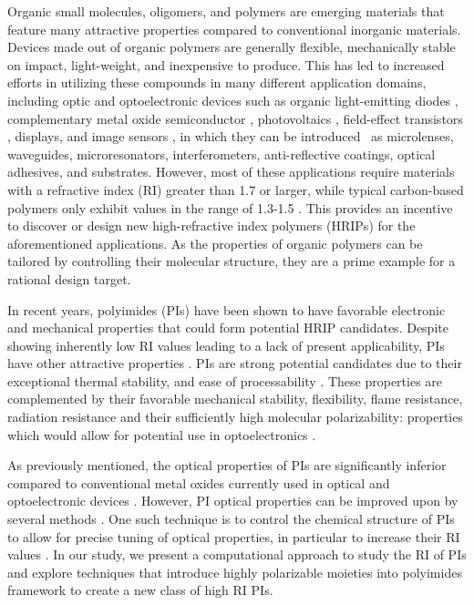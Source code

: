 Organic small molecules, oligomers, and polymers are emerging materials that feature many attractive properties compared to conventional inorganic materials. Devices made out of organic polymers are generally flexible, mechanically stable on impact, light-weight, and inexpensive to produce. This has led to increased efforts in utilizing these compounds in many different application domains, including optic and optoelectronic devices such as organic light-emitting diodes \cite{ThejoKalyani2012}, complementary metal oxide semiconductor \cite{Nakagawa2010},  photovoltaics \cite{Hachmann2011}, field-effect transistors \cite{Sirringhaus2009}, displays, and image sensors \cite{Angione2011}, in which they can be introduced \insitu\ as microlenses, waveguides, microresonators, interferometers, anti-reflective coatings, optical adhesives, and substrates. However, most of these applications require materials with a refractive index (RI) greater than 1.7 or larger, while typical carbon-based polymers only exhibit values in the range of 1.3-1.5 \cite{Liu2009}. This provides an incentive to discover or design new high-refractive index polymers (HRIPs) for the aforementioned applications. As the properties of organic polymers can be tailored by controlling their molecular structure, they are a prime example for a rational design target.

In recent years, polyimides (PIs) have been shown to have favorable electronic and mechanical properties that could form potential HRIP candidates. Despite showing inherently low RI values leading to a lack of present applicability, PIs have other attractive properties \citep{Mathews2007,Chang2006}.  
PIs are strong potential candidates due to their exceptional thermal stability, and ease of processability \citep{Duesselberg2011,Liu2007a,Higashihara2015}. These properties are complemented by their favorable mechanical stability, flexibility, flame resistance, radiation resistance and their sufficiently high molecular polarizability: properties which would allow for potential use in optoelectronics \citep{Mittal2013,Barikani2000}.

As previously mentioned, the optical properties of PIs are significantly inferior compared to conventional metal oxides currently used in optical and optoelectronic devices \citep{Butnaru2013,Liu2009}. However, PI optical properties can be improved upon by several methods \citep{Fukuzaki2010,Liu2008b,Sydlik2011,Terraza2008,Carter2001}. One such technique is to control the chemical structure of PIs to allow for precise tuning of optical properties, in particular to increase their RI values \citep{Liu2007a,Terraza2008,Yu1995,You2008}. In our study, we present a computational approach to study the RI of PIs and explore techniques that introduce highly polarizable moieties into polyimides framework to create a new class of high RI PIs. 

